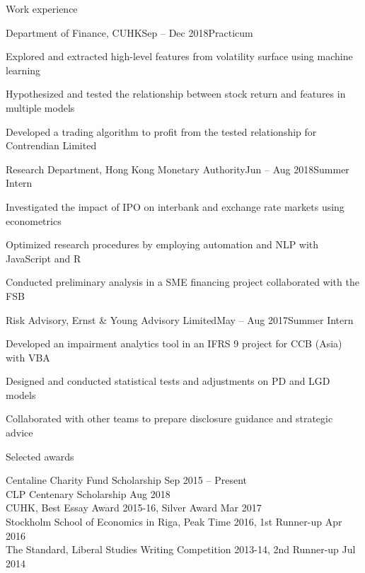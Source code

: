 \documentclass[10pt]{resume} %
\begin{document}
\begin{rSection}{Work experience}

\begin{rSubsection}{Department of Finance, CUHK}{Sep -- Dec 2018}{Practicum}{}
\item Explored and extracted high-level features from volatility surface using machine learning
\item Hypothesized and tested the relationship between stock return and features in multiple models
\item Developed a trading algorithm to profit from the tested relationship for Contrendian Limited
\end{rSubsection}


\begin{rSubsection}{Research Department, Hong Kong Monetary Authority}{Jun -- Aug 2018}{Summer Intern}{}
\item Investigated the impact of IPO on interbank and exchange rate markets using econometrics
\item Optimized research procedures by employing automation and NLP with JavaScript and R
\item Conducted preliminary analysis in a SME financing project collaborated with the FSB
\end{rSubsection}


\begin{rSubsection}{Risk Advisory, Ernst \& Young Advisory Limited}{May -- Aug 2017}{Summer Intern}{}
\item Developed an impairment analytics tool in an IFRS 9 project for CCB (Asia) with VBA
\item Designed and conducted statistical tests and adjustments on PD and LGD models
\item Collaborated with other teams to prepare disclosure guidance and strategic advice
\end{rSubsection}

\end{rSection}


\begin{rSection}{Selected awards}

Centaline Charity Fund Scholarship \hfill {Sep 2015 -- Present} \\
CLP Centenary Scholarship \hfill {Aug 2018} \\
CUHK, Best Essay Award 2015-16, Silver Award \hfill {Mar 2017} \\
Stockholm School of Economics in Riga, Peak Time 2016, 1st Runner-up \hfill {Apr 2016} \\
The Standard, Liberal Studies Writing Competition 2013-14, 2nd Runner-up \hfill {Jul 2014}

\end{rSection}
\end{document}
